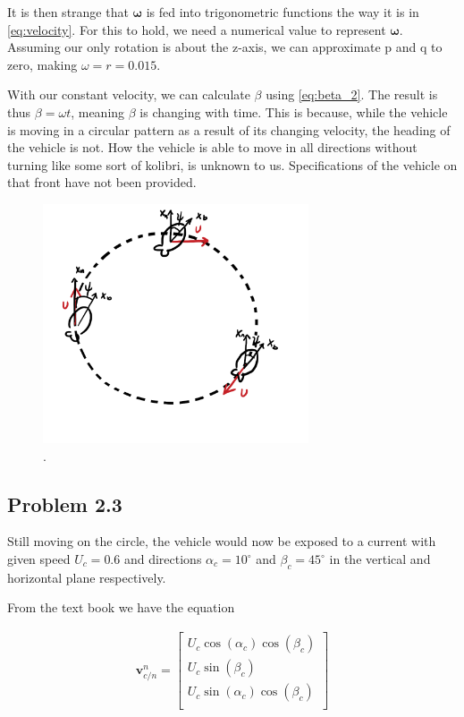 It is then strange that $\boldsymbol{\omega}$ is fed into trigonometric functions the way it is in \eqref{eq:velocity}. For this to hold, we need a numerical value to represent $\boldsymbol{\omega}$. Assuming our only rotation is about the z-axis, we can approximate p and q to zero, making $\omega = r = 0.015$.

With our constant velocity, we can calculate $\beta$ using \eqref{eq:beta_2}. The result is thus $\beta = \omega t$, meaning $\beta$ is changing with time. This is because, while the vehicle is moving in a circular pattern as a result of its changing velocity, the heading of the vehicle is not. How the vehicle is able to move in all directions without turning like some sort of kolibri, is unknown to us. Specifications of the vehicle on that front have not been provided. 

\begin{figure}[!htb]
	\centering
	\includegraphics[width=0.70\textwidth]{figures/circleWithU.png}
	\caption{.}
\label{fig:circleWithU}
\end{figure}

\subsection*{Problem 2.3}

Still moving on the circle, the vehicle would now be exposed to a current with given speed $U_c = 0.6$ and directions $\alpha_c = 10^\circ$ and $\beta_c = 45^\circ$ in the vertical and horizontal plane respectively.

From the text book \cite{Fossen2011} we have the equation

\begin{equation}
    \begin{aligned}
    \mathbf{v}_{c/n}^n 
    =
    \begin{bmatrix}
    U_c \cos(\alpha_c) \cos(\beta_c) \\
    U_c \sin(\beta_c) \\
    U_c \sin(\alpha_c) \cos(\beta_c)\\
    \end{bmatrix}
    \label{eq:v_n_c}
    \end{aligned}
\end{equation}


